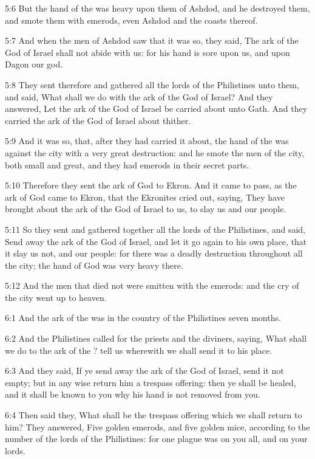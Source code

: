 5:6 But the hand of the \LORD was heavy upon them of Ashdod, and he destroyed them, and smote them with emerods, even Ashdod and the coasts thereof.

5:7 And when the men of Ashdod saw that it was so, they said, The ark of the God of Israel shall not abide with us: for his hand is sore upon us, and upon Dagon our god.

5:8 They sent therefore and gathered all the lords of the Philistines unto them, and said, What shall we do with the ark of the God of Israel? And they answered, Let the ark of the God of Israel be carried about unto Gath. And they carried the ark of the God of Israel about thither.

5:9 And it was so, that, after they had carried it about, the hand of the \LORD was against the city with a very great destruction: and he smote the men of the city, both small and great, and they had emerods in their secret parts.

5:10 Therefore they sent the ark of God to Ekron. And it came to pass, as the ark of God came to Ekron, that the Ekronites cried out, saying, They have brought about the ark of the God of Israel to us, to slay us and our people.

5:11 So they sent and gathered together all the lords of the Philistines, and said, Send away the ark of the God of Israel, and let it go again to his own place, that it slay us not, and our people: for there was a deadly destruction throughout all the city; the hand of God was very heavy there.

5:12 And the men that died not were smitten with the emerods: and the cry of the city went up to heaven.

6:1 And the ark of the \LORD was in the country of the Philistines seven months.

6:2 And the Philistines called for the priests and the diviners, saying, What shall we do to the ark of the \LORD? tell us wherewith we shall send it to his place.

6:3 And they said, If ye send away the ark of the God of Israel, send it not empty; but in any wise return him a trespass offering: then ye shall be healed, and it shall be known to you why his hand is not removed from you.

6:4 Then said they, What shall be the trespass offering which we shall return to him? They answered, Five golden emerods, and five golden mice, according to the number of the lords of the Philistines: for one plague was on you all, and on your lords.

